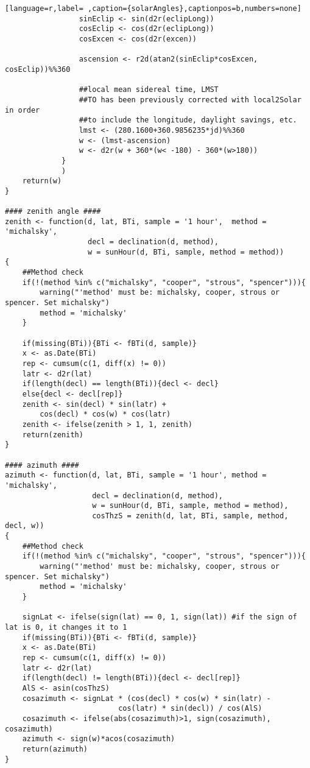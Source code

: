 \begin{lstlisting}[language=r,label= ,caption={solarAngles},captionpos=b,numbers=none]
                 sinEclip <- sin(d2r(eclipLong))
                 cosEclip <- cos(d2r(eclipLong))
                 cosExcen <- cos(d2r(excen))

                 ascension <- r2d(atan2(sinEclip*cosExcen, cosEclip))%%360

                 ##local mean sidereal time, LMST
                 ##TO has been previously corrected with local2Solar in order
                 ##to include the longitude, daylight savings, etc.
                 lmst <- (280.1600+360.9856235*jd)%%360
                 w <- (lmst-ascension)
                 w <- d2r(w + 360*(w< -180) - 360*(w>180))
             }
             )
    return(w)
}

#### zenith angle ####
zenith <- function(d, lat, BTi, sample = '1 hour',  method = 'michalsky',
                   decl = declination(d, method),
                   w = sunHour(d, BTi, sample, method = method))
{
    ##Method check
    if(!(method %in% c("michalsky", "cooper", "strous", "spencer"))){
        warning("'method' must be: michalsky, cooper, strous or spencer. Set michalsky")
        method = 'michalsky'
    }

    if(missing(BTi)){BTi <- fBTi(d, sample)}
    x <- as.Date(BTi)
    rep <- cumsum(c(1, diff(x) != 0))
    latr <- d2r(lat)
    if(length(decl) == length(BTi)){decl <- decl}
    else{decl <- decl[rep]}
    zenith <- sin(decl) * sin(latr) +
        cos(decl) * cos(w) * cos(latr)
    zenith <- ifelse(zenith > 1, 1, zenith)
    return(zenith)
}

#### azimuth ####
azimuth <- function(d, lat, BTi, sample = '1 hour', method = 'michalsky',
                    decl = declination(d, method),
                    w = sunHour(d, BTi, sample, method = method),
                    cosThzS = zenith(d, lat, BTi, sample, method, decl, w))
{
    ##Method check
    if(!(method %in% c("michalsky", "cooper", "strous", "spencer"))){
        warning("'method' must be: michalsky, cooper, strous or spencer. Set michalsky")
        method = 'michalsky'
    }

    signLat <- ifelse(sign(lat) == 0, 1, sign(lat)) #if the sign of lat is 0, it changes it to 1
    if(missing(BTi)){BTi <- fBTi(d, sample)}
    x <- as.Date(BTi)
    rep <- cumsum(c(1, diff(x) != 0))
    latr <- d2r(lat)
    if(length(decl) != length(BTi)){decl <- decl[rep]}
    AlS <- asin(cosThzS)
    cosazimuth <- signLat * (cos(decl) * cos(w) * sin(latr) -
                          cos(latr) * sin(decl)) / cos(AlS)
    cosazimuth <- ifelse(abs(cosazimuth)>1, sign(cosazimuth), cosazimuth)
    azimuth <- sign(w)*acos(cosazimuth)
    return(azimuth)
}
\end{lstlisting}
